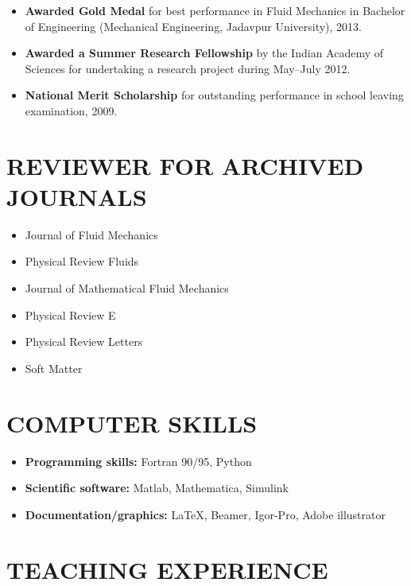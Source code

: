 \documentclass[10pt]{res} %
\begin{document}
\begin{resume}
\begin{itemize}
		\item \textbf{Awarded Gold Medal} for best performance in Fluid Mechanics in Bachelor of Engineering (Mechanical Engineering, Jadavpur University), 2013.
		
		\item \textbf{Awarded a Summer Research Fellowship} by the Indian Academy of Sciences for undertaking a research project during May--July 2012.
		
     	\item \textbf{National Merit Scholarship} for outstanding performance in school leaving examination, 2009.
		\end{itemize}

\section{{REVIEWER FOR ARCHIVED JOURNALS}}
\vspace*{8mm}
\begin{itemize}
	\item Journal of Fluid Mechanics
	\item Physical Review Fluids
	\item Journal of Mathematical Fluid Mechanics
	\item Physical Review E
	\item Physical Review Letters
	\item Soft Matter
\end{itemize}
		

\section{{COMPUTER SKILLS}}

\vspace*{8mm}
\begin{itemize}
	\item \textbf{Programming skills:} Fortran 90/95, Python
	\item \textbf{Scientific software:} Matlab, Mathematica, Simulink
	\item \textbf{Documentation/graphics:} \LaTeX, Beamer, Igor-Pro, Adobe illustrator
\end{itemize}



\section{{TEACHING EXPERIENCE}}

\end{resume}
\end{document}

